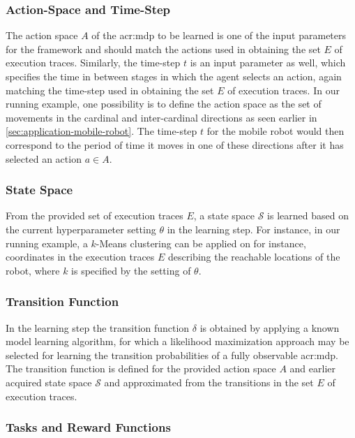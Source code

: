 \subsubsection{Action-Space and Time-Step}
The action space $A$ of the \acrshort{acr:mdp} to be learned is one of the input parameters for the framework and should match the actions used in obtaining the set $E$ of execution traces.
Similarly, the time-step $t$ is an input parameter as well, which specifies the time in between stages in which the agent selects an action, again matching the time-step used in obtaining the set $E$ of execution traces.
In our running example, one possibility is to define the action space as the set of movements in the cardinal and inter-cardinal directions as seen earlier in \autoref{sec:application-mobile-robot}.
The time-step $t$ for the mobile robot would then correspond to the period of time it moves in one of these directions after it has selected an action $a \in A$.

\subsubsection{State Space}
From the provided set of execution traces $E$, a state space $\mathcal{S}$ is learned based on the current hyperparameter setting $\theta$ in the learning step.
For instance, in our running example, a $k$-Means clustering can be applied on for instance, coordinates in the execution traces $E$ describing the reachable locations of the robot, where $k$ is specified by the setting of $\theta$.

\subsubsection{Transition Function}
In the learning step the transition function $\delta$ is obtained by applying a known model learning algorithm, for which a likelihood maximization approach may be selected for learning the transition probabilities of a fully observable \acrshort{acr:mdp}.
The transition function is defined for the provided action space $A$ and earlier acquired state space $\mathcal{S}$ and approximated from the transitions in the set $E$ of execution traces.

\subsubsection{Tasks and Reward Functions}

